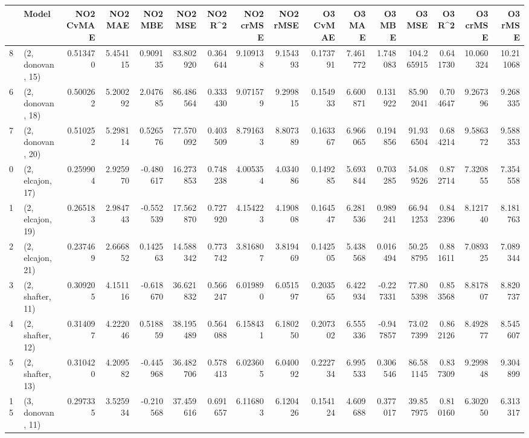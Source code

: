 \begin{tabular}{llrrrrrrrrrrrrrr}
\toprule
{} &             Model &  NO2 CvMAE &   NO2 MAE &   NO2 MBE &    NO2 MSE &   NO2 R\textasciicircum2 &  NO2 crMSE &  NO2 rMSE &  O3 CvMAE &    O3 MAE &    O3 MBE &      O3 MSE &    O3 R\textasciicircum2 &   O3 crMSE &    O3 rMSE \\
\midrule
8  &  (2, donovan, 15) &   0.513470 &  5.454115 &  0.909135 &  83.802920 &  0.364644 &   9.109138 &  9.154393 &  0.173791 &  7.461772 &  1.748083 &  104.265915 &  0.641730 &  10.060324 &  10.211068 \\
6  &  (2, donovan, 18) &   0.500262 &  5.200292 &  2.047685 &  86.486564 &  0.333430 &   9.071579 &  9.299815 &  0.154933 &  6.600871 &  0.131922 &   85.902041 &  0.704647 &   9.267396 &   9.268335 \\
7  &  (2, donovan, 20) &   0.510252 &  5.298114 &  0.526576 &  77.570092 &  0.403509 &   8.791633 &  8.807389 &  0.163367 &  6.966065 &  0.194856 &   91.936504 &  0.684214 &   9.586372 &   9.588353 \\
0  &  (2, elcajon, 17) &   0.259904 &  2.925970 & -0.480617 &  16.273853 &  0.748238 &   4.005354 &  4.034086 &  0.149285 &  5.693844 &  0.703285 &   54.089526 &  0.872714 &   7.320855 &   7.354558 \\
1  &  (2, elcajon, 19) &   0.265183 &  2.984743 & -0.552539 &  17.562870 &  0.727920 &   4.154223 &  4.190808 &  0.164547 &  6.281536 &  0.989241 &   66.941253 &  0.842396 &   8.121740 &   8.181763 \\
2  &  (2, elcajon, 21) &   0.237469 &  2.666852 &  0.142563 &  14.588342 &  0.773742 &   3.816807 &  3.819469 &  0.142505 &  5.438568 &  0.016494 &   50.258795 &  0.881611 &   7.089325 &   7.089344 \\
3  &  (2, shafter, 11) &   0.309205 &  4.151116 & -0.618670 &  36.621832 &  0.566247 &   6.019890 &  6.051597 &  0.203565 &  6.422934 & -0.227331 &   77.805398 &  0.853568 &   8.817807 &   8.820737 \\
4  &  (2, shafter, 12) &   0.314097 &  4.222046 &  0.518859 &  38.195489 &  0.564088 &   6.158431 &  6.180250 &  0.207302 &  6.555336 & -0.947857 &   73.027399 &  0.862126 &   8.492877 &   8.545607 \\
5  &  (2, shafter, 13) &   0.310420 &  4.209582 & -0.445968 &  36.482706 &  0.578413 &   6.023605 &  6.040092 &  0.222734 &  6.995533 &  0.306546 &   86.581145 &  0.837309 &   9.299848 &   9.304899 \\
15 &  (3, donovan, 11) &   0.297335 &  3.525934 & -0.210568 &  37.459616 &  0.691657 &   6.116803 &  6.120426 &  0.154124 &  4.609688 &  0.377017 &   39.857975 &  0.810160 &   6.302050 &   6.313317 \\

\end{tabular}
